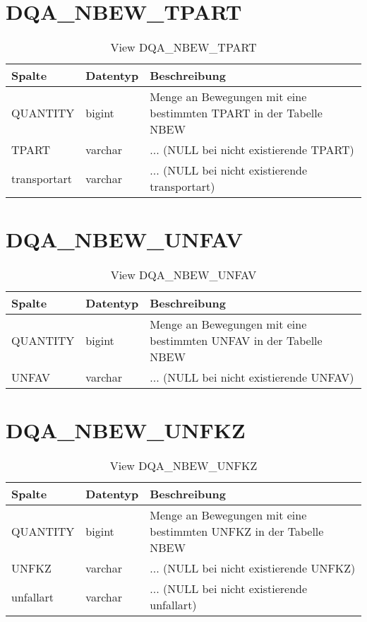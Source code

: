   \section{DQA\_NBEW\_TPART}

  \begin{table}[ht]
    \centering
    \caption{View DQA\_NBEW\_TPART}
    \label{tab:dqanbewtpart}
    \begin{tabular}{||l|l|p{10cm}||}
      \hline
      Spalte & Datentyp & Beschreibung \\ [0.5ex] \hline \hline
QUANTITY & bigint & Menge an Bewegungen mit eine bestimmten TPART in der Tabelle NBEW \\ \hline
TPART & varchar & ... (NULL bei nicht existierende TPART)\\ \hline
transportart & varchar & ... (NULL bei nicht existierende transportart)\\ \hline
    \end{tabular}
  \end{table}
 \clearpage
  \section{DQA\_NBEW\_UNFAV}

  \begin{table}[ht]
    \centering
    \caption{View DQA\_NBEW\_UNFAV}
    \label{tab:dqanbewunfav}
    \begin{tabular}{||l|l|p{10cm}||}
      \hline
      Spalte & Datentyp & Beschreibung \\ [0.5ex] \hline \hline
QUANTITY & bigint & Menge an Bewegungen mit eine bestimmten UNFAV in der Tabelle NBEW \\ \hline
UNFAV & varchar & ... (NULL bei nicht existierende UNFAV)\\ \hline
    \end{tabular}
  \end{table}
 \clearpage
  \section{DQA\_NBEW\_UNFKZ}

  \begin{table}[ht]
    \centering
    \caption{View DQA\_NBEW\_UNFKZ}
    \label{tab:dqanbewunfkz}
    \begin{tabular}{||l|l|p{10cm}||}
      \hline
      Spalte & Datentyp & Beschreibung \\ [0.5ex] \hline \hline
QUANTITY & bigint & Menge an Bewegungen mit eine bestimmten UNFKZ in der Tabelle NBEW \\ \hline
UNFKZ & varchar & ... (NULL bei nicht existierende UNFKZ)\\ \hline
unfallart & varchar & ... (NULL bei nicht existierende unfallart)\\ \hline
    \end{tabular}
  \end{table}
 \clearpage
